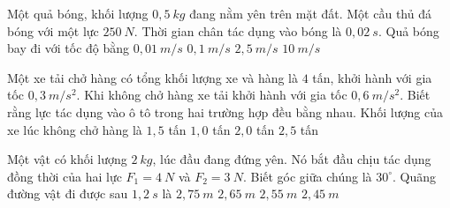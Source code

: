 \begin{vidu} %
Một quả bóng, khối lượng $0,5\ kg$ đang nằm yên trên mặt đất. Một cầu thủ đá bóng với một lực $250\ N$. Thời gian chân tác dụng vào bóng là $0,02\ s$. Quả bóng bay đi với tốc độ bằng
\choice
{$0,01\ m/s$}
{$0,1\ m/s$}
{$2,5\ m/s$}
{\True $10\ m/s$}

 \end{vidu}
\begin{vidu}%
Một xe tải chở hàng có tổng khối lượng xe và hàng là $4$ tấn, khởi hành với gia tốc $0,3\ m/s^2$. Khi không chở hàng xe tải khởi hành với gia tốc $0,6\ m/s^2$. Biết rằng lực tác dụng vào ô tô trong hai trường hợp đều bằng nhau. Khối lượng của xe lúc không chở hàng là
\choice
{$1,5$ tấn}
{$1,0$ tấn}
{\True $2,0$ tấn}
{$2,5$ tấn}
 \end{vidu}
\begin{vidu}%
Một vật có khối lượng $2\ kg$, lúc đầu đang đứng yên. Nó bắt đầu chịu tác dụng đồng thời của hai lực $F_1=4\ N$  và $F_2=3\ N$. Biết góc giữa chúng là $30^\circ$. Quãng đường vật đi được sau $1,2\ s$ là
\choice
{$2,75\ m$}
{$2,65\ m$}
{$2,55\ m$}
{\True $2,45\ m$}

 \end{vidu}

